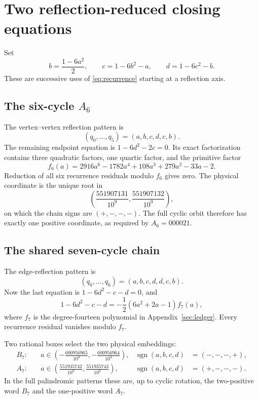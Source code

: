 \section{Two reflection-reduced closing equations}

Set
\begin{equation}\label{eq:chain}
 b=\frac{1-6a^2}{2},\qquad
 c=1-6b^2-a,\qquad
 d=1-6c^2-b.
\end{equation}
These are successive uses of \eqref{eq:recurrence} starting at a reflection
axis.

\subsection{The six-cycle \texorpdfstring{\(A_6\)}{A6}}

The vertex--vertex reflection pattern is
\begin{equation}\label{eq:A6pattern}
 (q_0,\ldots,q_5)=(a,b,c,d,c,b).
\end{equation}
The remaining endpoint equation is \(1-6d^2-2c=0\).  Its exact
factorization contains three quadratic factors, one quartic factor, and the
primitive factor
\begin{equation}\label{eq:A6coordinate}
 f_6(a)=2916a^6-1782a^4+108a^3+279a^2-33a-2.
\end{equation}
Reduction of all six recurrence residuals modulo \(f_6\) gives zero.  The
physical coordinate is the unique root in
\[
 \left(\frac{551907131}{10^9},\frac{551907132}{10^9}\right),
\]
on which the chain signs are \((+,-,-,-)\).  The full cyclic orbit therefore
has exactly one positive coordinate, as required by \(A_6=000021\).

\subsection{The shared seven-cycle chain}

The edge-reflection pattern is
\begin{equation}\label{eq:P7pattern}
 (q_0,\ldots,q_6)=(a,b,c,d,d,c,b).
\end{equation}
Now the last equation is \(1-6d^2-c-d=0\), and
\begin{equation}\label{eq:P7factor}
 1-6d^2-c-d=-\frac12(6a^2+2a-1)f_7(a),
\end{equation}
where \(f_7\) is the degree-fourteen polynomial in
Appendix~\ref{sec:ledger}.  Every recurrence residual vanishes modulo
\(f_7\).

Two rational boxes select the two physical embeddings:
\begin{align*}
 B_7:&\quad
 a\in\left(-\frac{600956965}{10^9},-\frac{600956964}{10^9}\right),
 &\operatorname{sgn}(a,b,c,d)&=(-,-,-,+),\\
 A_7:&\quad
 a\in\left(\frac{551935742}{10^9},\frac{551935743}{10^9}\right),
 &\operatorname{sgn}(a,b,c,d)&=(+,-,-,-).
\end{align*}
In the full palindromic patterns these are, up to cyclic rotation, the
two-positive word \(B_7\) and the one-positive word \(A_7\).

